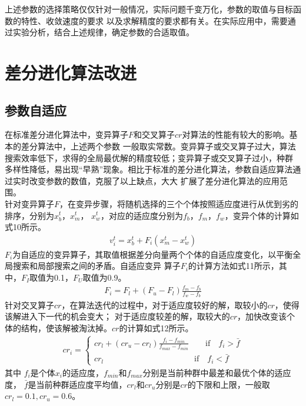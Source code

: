 \documentclass[a4paper,11pt,onecolumn,twoside]{article}
\begin{document}
\begin{CJK*}{GBK}{song}
\begin{multicols}{2}
\indent 上述参数的选择策略仅仅针对一般情况，实际问题千变万化，参数的取值与目标函数的特性、收敛速度的要求
以及求解精度的要求都有关。在实际应用中，需要通过实验分析，结合上述规律，确定参数的合适取值。


\section{差分进化算法改进}
\subsection{参数自适应}
\indent 在标准差分进化算法中，变异算子$F$和交叉算子$cr$对算法的性能有较大的影响。基本的差分算法中，上述两个参数
一般取实常数。变异算子或交叉算子过大，算法搜索效率低下，求得的全局最优解的精度较低；变异算子或交叉算子过小，种群
多样性降低，易出现“早熟”现象。相比于标准的差分进化算法，参数自适应算法通过实时改变参数的数值，克服了以上缺点，大大
扩展了差分进化算法的应用范围。\\
\indent 针对变异算子$F$，在变异步骤，将随机选择的三个个体按照适应度进行从优到劣的排序，分别为$x_b^t$，$x_m^t$，
$x_w^t$，对应的适应度分别为$f_b$，$f_m$，$f_w$，变异个体的计算如式10所示。
	\begin{equation}
		\begin{split}
			v_i^t=x_{b}^t+F_i\left(x_{m}^t-x_{w}^t\right)
		\end{split}
	\end{equation}
$F_i$为自适应的变异算子，其取值根据差分向量两个个体的自适应度变化，以平衡全局搜索和局部搜索之间的矛盾。自适应变异
算子$F_i$的计算方法如式11所示，其中，$F_I$取值为0.1，$F_U$取值为0.9。
	\begin{equation}
		\begin{split}
			F_i = F_l +\left(F_u-F_l\right)\frac{f_m-f_b}{f_w-f_b}
		\end{split}
	\end{equation}
\indent 针对交叉算子$cr$，在算法迭代的过程中，对于适应度较好的解，取较小的$cr$，使得该解进入下一代的机会变大；
对于适应度较差的解，取较大的$cr$，加快改变该个体的结构，使该解被淘汰掉。$cr$的计算如式12所示。
	\begin{equation}
		\begin{split}
			cr_i =
			\begin{cases}
				cr_l+\left(cr_u-cr_l\right)\frac{f_i-f_{min}}{f_{max}-f_{min}}  \qquad \mathrm{if} \quad f_i>\bar{f} \\
				cr_l \qquad\qquad \qquad \qquad \qquad \quad \mathrm{if}\quad f_i<\bar{f}
			\end{cases}
		\end{split}
	\end{equation}
其中 $f_i$是个体$x_i$的适应度，$f_{min}$和$f_{max}$分别是当前种群中最差和最优个体的适应度，
$\bar{f}$是当前种群适应度平均值，$cr_l$和$cr_u$分别是$cr$的下限和上限，一般取$cr_l=0.1,cr_u=0.6$。


\end{multicols}
\end{CJK*}
\end{document}

